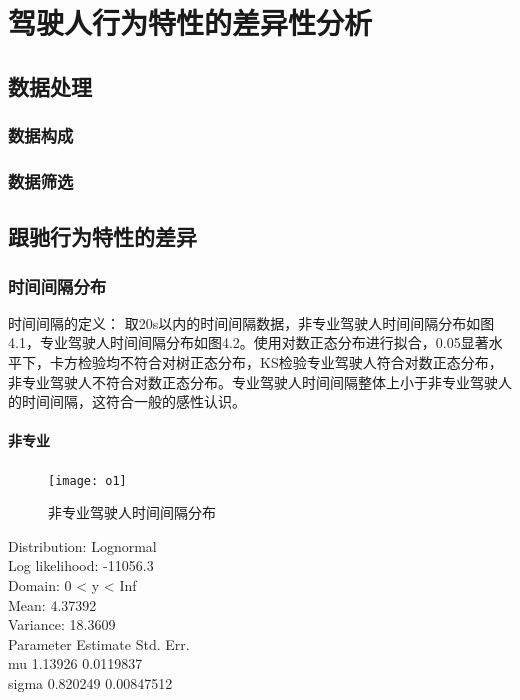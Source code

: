 \chapter{驾驶人行为特性的差异性分析}
\section{数据处理}
\subsection{数据构成}
\subsection{数据筛选}

\section{跟驰行为特性的差异}


\subsection{时间间隔分布}
时间间隔的定义：
取20s以内的时间间隔数据，非专业驾驶人时间间隔分布如图4.1，专业驾驶人时间间隔分布如图4.2。使用对数正态分布进行拟合，0.05显著水平下，卡方检验均不符合对树正态分布，KS检验专业驾驶人符合对数正态分布，非专业驾驶人不符合对数正态分布。专业驾驶人时间间隔整体上小于非专业驾驶人的时间间隔，这符合一般的感性认识。


\subsubsection{非专业}
\begin{figure}[htpb]
	\centering
	\label{tgap_distru:non_pro}
	\texttt{[image: o1]}
	\caption{非专业驾驶人时间间隔分布}
\end{figure}


Distribution:    Lognormal\\
Log likelihood:  -11056.3\\
Domain:          0 < y < Inf\\
Mean:            4.37392\\
Variance:        18.3609\\

Parameter  Estimate  Std. Err. \\
mu          1.13926   0.0119837\\
sigma      0.820249  0.00847512\\

